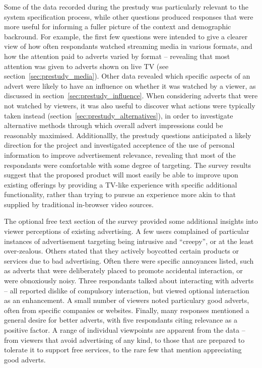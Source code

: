Some of the data recorded during the prestudy was particularly relevant to the system specification process, while other questions produced responses that were more useful for informing a fuller picture of the context and demographic backround.
For example, the first few questions were intended to give a clearer view of how often respondants watched streaming media in various formats, and how the attention paid to adverts varied by format -- revealing that most attention was given to adverts shown on live TV (see section~\ref{sec:prestudy_media}).
Other data revealed which specific aspects of an advert were likely to have an influence on whether it was watched by a viewer, as discussed in section~\ref{sec:prestudy_influence}.
When considering adverts that were not watched by viewers, it was also useful to discover what actions were typically taken instead (section~\ref{sec:prestudy_alternatives}), in order to investigate alternative methods through which overall advert impressions could be reasonably maximised.
Additionallly, the prestudy questions anticipated a likely direction for the project and investigated acceptence of the use of personal information to improve advertisement relevance, revealing that most of the respondants were comfortable with some degree of targeting.
The survey results suggest that the proposed product will most easily be able to improve upon existing offerings by providing a TV-like experience with specific additional functionality, rather than trying to pursue an experience more akin to that supplied by traditional in-browser video sources.

The optional free text section of the survey provided some additional insights into viewer perceptions of existing advertising.
A few users complained of particular instances of advertisement targeting being intrusive and ``creepy'', or at the least over-zealous. 
Others stated that they actively boycotted certain products or services due to bad advertising.
Often there were specific annoyances listed, such as adverts that were deliberately placed to promote accidental interaction, or were obnoxiously noisy.
Three respondants talked about interacting with adverts -- all reported dislike of compulsory interaction, but viewed optional interaction as an enhancement.
A small number of viewers noted particulary good adverts, often from specific companies or websites. 
Finally, many responses mentioned a general desire for better adverts, with five respondants citing relevance as a positive factor.
A range of individual viewpoints are apparent from the data -- from viewers that avoid advertising of any kind, to those that are prepared to tolerate it to support free services, to the rare few that mention appreciating good adverts.


